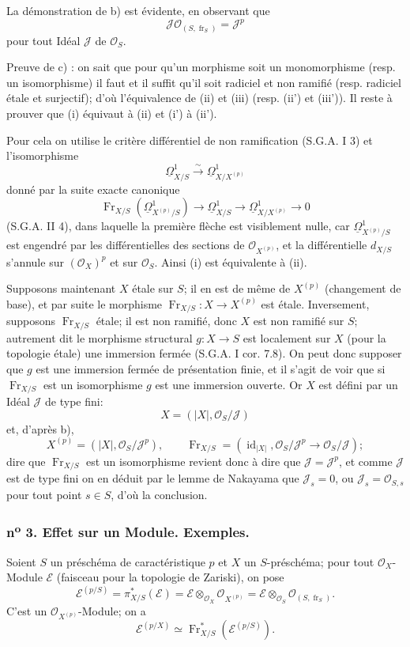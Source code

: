 \documentclass[11pt]{article}
\providecommand{\OO}{\mathcal{O}}
\providecommand{\id}{\operatorname{id}}
\providecommand{\cE}{\mathcal E}
\providecommand{\id}{\operatorname{id}}
\providecommand{\id}{\operatorname{id}}
\providecommand{\id}{\operatorname{id}}
\providecommand{\id}{\operatorname{id}}
\providecommand{\fr}{\operatorname{fr}}
\providecommand{\Fr}{\operatorname{Fr}}
\providecommand{\JJ}{\mathcal J}
\providecommand{\Fr}{\operatorname{Fr}}
\providecommand{\fr}{\operatorname{fr}}
\providecommand{\id}{\operatorname{id}}
\begin{document}
La démonstration de b) est évidente, en observant que
\[
\JJ\OO_{(S,\fr_S)}=\JJ^p
\]
pour tout Idéal $\JJ$ de $\OO_S$.

Preuve de c) : on sait que pour qu'un morphisme soit un
monomorphisme (resp. un isomorphisme) il faut et il suffit qu'il soit radiciel et non ramifié (resp. radiciel étale et surjectif); d'où l'équivalence de (ii) et (iii) (resp. (ii') et (iii')). Il reste à prouver que (i) équivaut à (ii) et (i') à (ii').

Pour cela on utilise le critère différentiel de non ramification (S.G.A. I 3) et l'isomorphisme
\[
\underline{\Omega}^1_{X/S}\xrightarrow{\sim} \underline{\Omega}^1_{X/X^{(p)}}
\]
donné par la suite exacte canonique
\[
\Fr_{X/S}(\underline{\Omega}^1_{X^{(p)}/S})\longrightarrow \underline{\Omega}^1_{X/S}
\longrightarrow \underline{\Omega}^1_{X/X^{(p)}}\longrightarrow 0
\]
(S.G.A. II 4), dans laquelle la première flèche est visiblement nulle, car $\underline{\Omega}^1_{X^{(p)}/S}$ est engendré par les différentielles des sections de $\OO_{X^{(p)}}$, et la différentielle $d_{X/S}$ s'annule sur $(\OO_X)^p$ et sur $\OO_S$. Ainsi (i) est équivalente à (ii).

Supposons maintenant $X$ étale sur $S$; il en est de même de $X^{(p)}$ (changement de base), et par suite le morphisme $\Fr_{X/S}:X\to X^{(p)}$ est étale. Inversement, supposons $\Fr_{X/S}$ étale; il est non ramifié, donc $X$ est non ramifié sur $S$; autrement dit le morphisme structural $g:X\to S$ est localement sur $X$ (pour la topologie étale) une immersion fermée (S.G.A. I cor. 7.8). On peut donc supposer que $g$ est une immersion fermée de présentation finie, et il s'agit de voir que si $\Fr_{X/S}$ est un isomorphisme $g$ est une immersion ouverte. Or $X$ est défini par un Idéal $\JJ$ de type fini:
\[
X=(|X|,\OO_S/\JJ)
\]
et, d'après b),
\[
X^{(p)}=(|X|,\OO_S/\JJ^p),
\qquad
\Fr_{X/S}=(\id_{|X|},\OO_S/\JJ^p\to\OO_S/\JJ);
\]
dire que $\Fr_{X/S}$ est un isomorphisme revient donc à dire que $\JJ=\JJ^p$, et comme $\JJ$ est de type fini on en déduit par le lemme de Nakayama que $\JJ_s=0$, ou $\JJ_s=\OO_{S,s}$ pour tout point $s\in S$, d'où la conclusion.

\subsubsection*{n\textsuperscript{o} 3. Effet sur un Module. Exemples.}

Soient $S$ un préschéma de caractéristique $p$ et $X$ un $S$-préschéma; pour tout $\OO_X$-Module $\cE$ (faisceau pour la topologie de Zariski), on pose
\[
\cE^{(p/S)}=\pi_{X/S}^*(\cE)=\cE\otimes_{\OO_X}\OO_{X^{(p)}}
 =\cE\otimes_{\OO_S}\OO_{(S,\fr_S)}.
\]
C'est un $\OO_{X^{(p)}}$-Module; on a
\[
\cE^{(p/X)}\simeq \Fr_{X/S}^*(\cE^{(p/S)}).
\]
\end{document}
